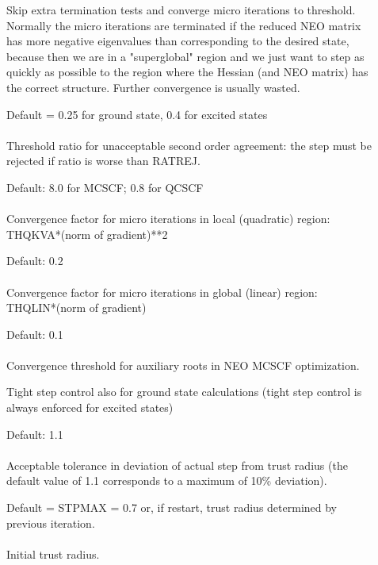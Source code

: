 \begin{description}
\item[]
  Skip extra termination tests and converge micro iterations to
  threshold.   Normally the micro iterations are terminated if the
  reduced NEO matrix has more negative eigenvalues than corresponding
  to the desired state, because then we are in a "superglobal" region
  and we just want to step as quickly as possible to the region where
  the Hessian (and NEO matrix) has the correct structure.  Further
  convergence is usually wasted.

\item[]
  Default = 0.25 for ground state, 0.4 for excited states\\
   \\
  Threshold ratio for unacceptable second order agreement: the step
  must be rejected if ratio is worse than RATREJ.

\item[]
  Default: 8.0 for MCSCF; 0.8 for QCSCF\\
   \\
  Convergence factor for micro iterations in local (quadratic) region:
  THQKVA*(norm of gradient)**2

\item[]
  Default: 0.2\\
   \\
  Convergence factor for micro iterations in global (linear) region: \\
  THQLIN*(norm of gradient)

\item[]
  Default: 0.1\\
   \\
  Convergence threshold for auxiliary roots in NEO MCSCF optimization.

\item[]
  Tight step control also for ground state calculations
  (tight step control is always enforced for excited states)

\item[]
  Default: 1.1\\
   \\
  Acceptable tolerance in deviation of actual step from trust radius
  (the default value of 1.1 corresponds to a maximum of 10\% deviation).

\item[]
  Default = STPMAX = 0.7 or, if restart, trust radius determined by previous
            iteration.\\
   \\
  Initial trust radius.

\end{description}


